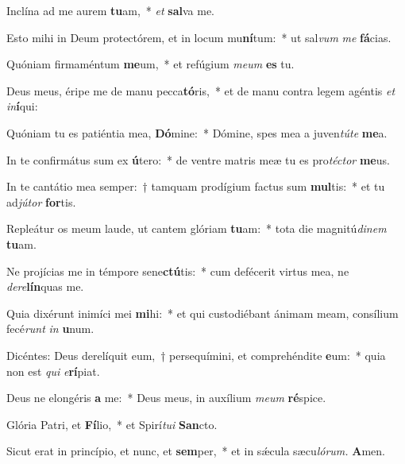 \item Inclína ad me aurem \textbf{tu}am,~* \textit{et} \textbf{sal}va me.
\item Esto mihi in Deum protectórem, et in locum mu\textbf{ní}tum:~* ut sal\textit{vum} \textit{me} \textbf{fá}cias.
\item Quóniam firmaméntum \textbf{me}um,~* et refúgium \textit{meum} \textbf{es} tu.
\item Deus meus, éripe me de manu pecca\textbf{tó}ris,~* et de manu contra legem agéntis \textit{et} \textit{in}\textbf{í}qui:
\item Quóniam tu es patiéntia mea, \textbf{Dó}mine:~* Dómine, spes mea a juven\textit{túte} \textbf{me}a.
\item In te confirmátus sum ex \textbf{ú}tero:~* de ventre matris meæ tu es pro\tinyhspace\textit{téctor} \textbf{me}us.
\item In te cantátio mea semper:~† tamquam prodígium factus sum \textbf{mul}tis:~* et tu ad\textit{jútor} \textbf{for}tis.
\item Repleátur os meum laude, ut cantem glóriam \textbf{tu}am:~* tota die magnitú\hspace{0.02em}\textit{dinem} \textbf{tu}am.
\item Ne projícias me in témpore sene\textbf{ctú}tis:~* cum defécerit virtus mea, ne \textit{dere}\textbf{lín}quas me.
\item Quia dixérunt inimíci mei \textbf{mi}hi:~* et qui custodiébant ánimam meam, consílium fecé\tinyhspace\textit{runt} \textit{in} \textbf{u}num.
\item Dicéntes: Deus derelíquit eum,~† persequímini, et comprehéndite \textbf{e}um:~* quia non est \textit{qui} \textit{e}\textbf{rí}piat.
\item Deus ne elongéris \textbf{a} me:~* Deus meus, in auxílium \textit{meum} \textbf{ré}spice.
\item Glória Patri, et \textbf{Fí}lio,~* et Spirí\tinyhspace\textit{tui} \textbf{San}cto.
\item Sicut erat in princípio, et nunc, et \textbf{sem}per,~* et in sǽcula sæcu\tinyhspace\textit{lórum.} \textbf{A}men.

